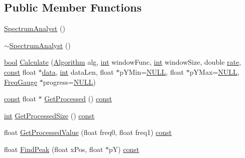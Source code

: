 \subsection*{Public Member Functions}
\begin{DoxyCompactItemize}
\item 
\hyperlink{class_spectrum_analyst_a0aa8836644b3601ed3f7f95455ad1c44}{Spectrum\+Analyst} ()
\item 
\hyperlink{class_spectrum_analyst_a988f158a3f679e3a0ff4e968500b31d4}{$\sim$\+Spectrum\+Analyst} ()
\item 
\hyperlink{mac_2config_2i386_2lib-src_2libsoxr_2soxr-config_8h_abb452686968e48b67397da5f97445f5b}{bool} \hyperlink{class_spectrum_analyst_af8ebb2ab1305e7bcb320d563846b13ea}{Calculate} (\hyperlink{class_spectrum_analyst_a316d97b25a7683913eec8e08d5645105}{Algorithm} alg, \hyperlink{xmltok_8h_a5a0d4a5641ce434f1d23533f2b2e6653}{int} window\+Func, \hyperlink{xmltok_8h_a5a0d4a5641ce434f1d23533f2b2e6653}{int} window\+Size, double \hyperlink{seqread_8c_ad89d3fac2deab7a9cf6cfc8d15341b85}{rate}, \hyperlink{getopt1_8c_a2c212835823e3c54a8ab6d95c652660e}{const} float $\ast$\hyperlink{lib_2expat_8h_ac39e72a1de1cb50dbdc54b08d0432a24}{data}, \hyperlink{xmltok_8h_a5a0d4a5641ce434f1d23533f2b2e6653}{int} data\+Len, float $\ast$p\+Y\+Min=\hyperlink{px__mixer_8h_a070d2ce7b6bb7e5c05602aa8c308d0c4}{N\+U\+LL}, float $\ast$p\+Y\+Max=\hyperlink{px__mixer_8h_a070d2ce7b6bb7e5c05602aa8c308d0c4}{N\+U\+LL}, \hyperlink{class_freq_gauge}{Freq\+Gauge} $\ast$progress=\hyperlink{px__mixer_8h_a070d2ce7b6bb7e5c05602aa8c308d0c4}{N\+U\+LL})
\item 
\hyperlink{getopt1_8c_a2c212835823e3c54a8ab6d95c652660e}{const} float $\ast$ \hyperlink{class_spectrum_analyst_a576c7b1e3cf0ff8ef9a314d6ee15bfd3}{Get\+Processed} () \hyperlink{getopt1_8c_a2c212835823e3c54a8ab6d95c652660e}{const} 
\item 
\hyperlink{xmltok_8h_a5a0d4a5641ce434f1d23533f2b2e6653}{int} \hyperlink{class_spectrum_analyst_a55e79d7027f71a120329278de89e277d}{Get\+Processed\+Size} () \hyperlink{getopt1_8c_a2c212835823e3c54a8ab6d95c652660e}{const} 
\item 
float \hyperlink{class_spectrum_analyst_a2166a65ee92933772569c3aa612dc81b}{Get\+Processed\+Value} (float freq0, float freq1) \hyperlink{getopt1_8c_a2c212835823e3c54a8ab6d95c652660e}{const} 
\item 
float \hyperlink{class_spectrum_analyst_af9bdc79636a54a2c8ac95aa5a4ff5be8}{Find\+Peak} (float x\+Pos, float $\ast$pY) \hyperlink{getopt1_8c_a2c212835823e3c54a8ab6d95c652660e}{const} 
\end{DoxyCompactItemize}


